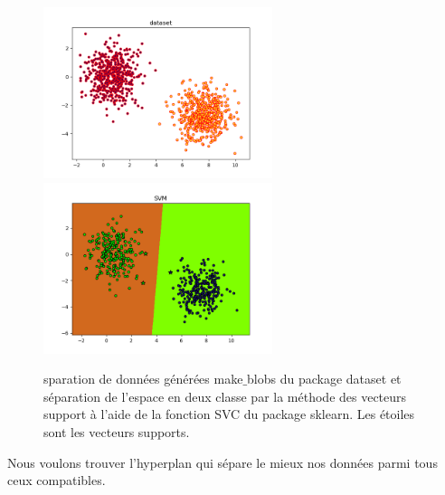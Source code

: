 \documentclass[a4paper,12pt,titlepage]{report}
\begin{document}
\begin{figure}[!h]
	\begin{center}
	\centering	
		\includegraphics[height = 5cm, keepaspectratio]{graphes/SVM_donnee.png}
		\includegraphics[height = 5cm, keepaspectratio]{graphes/SVM_separee.png}
		\caption{sparation de données générées make$\_$blobs du package dataset et séparation de l'espace en deux classe par la méthode des vecteurs support à l'aide de la fonction SVC du package sklearn. Les étoiles sont les vecteurs supports.}
	\end{center}
\end{figure}
Nous voulons trouver l'hyperplan qui sépare le mieux nos données parmi tous ceux compatibles.
\end{document}
